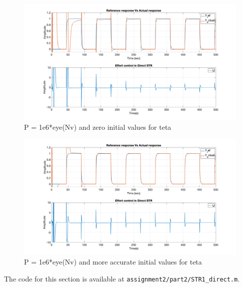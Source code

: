 \begin{figure}
	\centering
	\includegraphics[width=\textwidth]{images/str63.png}
	\caption{P = 1e6*eye(Nv) and zero initial values for teta}
	\label{fig:str63}
\end{figure}

\begin{figure}
	\centering
	\includegraphics[width=\textwidth]{images/str64.png}
	\caption{P = 1e6*eye(Nv) and more accurate initial values for teta}
	\label{fig:str64}
\end{figure}
The code  for this section is available at \lstinline|assignment2/part2/STR1_direct.m|.

